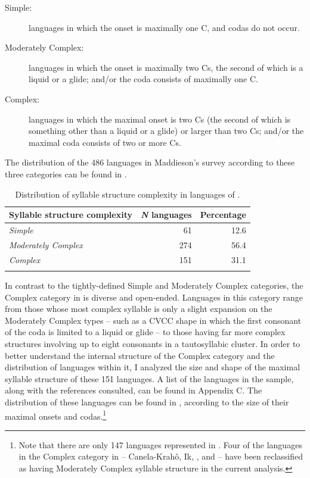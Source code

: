 \begin{description}
\item[Simple:] languages in which the onset is maximally one C, and codas do not occur.
\item[Moderately Complex:] languages in which the onset is maximally two Cs, the second of which is a liquid or a glide; and/or the coda consists of maximally one C.
\item[Complex:] languages in which the maximal onset is two Cs (the second of which is something other than a liquid or a glide) or larger than two Cs; and/or the maximal coda consists of two or more Cs.
\end{description}

The distribution of the 486 languages in Maddieson's survey according to these three categories can be found in .

\begin{table}
\begin{tabular}{lrr}
\lsptoprule
Syllable structure complexity & \textit{N} languages & Percentage\\\midrule
\textit{Simple} & 61 & 12.6\\
\textit{Moderately Complex} & 274 & 56.4\\
\textit{Complex} & 151 & 31.1\\
\lspbottomrule
\end{tabular}
\caption{\label{tab:2.1}Distribution of syllable structure complexity in languages of \citet{Maddieson2013a}.}
\end{table}

  In contrast to the tightly-defined Simple and Moderately Complex categories, the Complex category in \citet{Maddieson2013a} is diverse and open-ended. Languages in this category range from those whose most complex syllable is only a slight expansion on the Moderately Complex types -- such as a CVCC shape in which the first consonant of the coda is limited to a liquid or glide -- to those having far more complex structures involving up to eight consonants in a tautosyllabic cluster. In order to better understand the internal structure of the Complex category and the distribution of languages within it, I analyzed the size and shape of the maximal syllable structure of these 151 languages. A list of the languages in the sample, along with the references consulted, can be found in Appendix C. The distribution of these languages can be found in , according to the size of their maximal onsets and codas.\footnote{{Note that there are only 147 languages represented in . Four of the languages in the Complex category in \citet{Maddieson2013a} -- Canela-Krahô, Ik, , and  -- have been reclassified as having Moderately Complex syllable structure in the current analysis.}}

